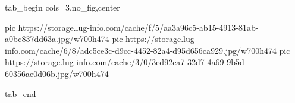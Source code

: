  
 
 
 
 


\ifcmt
  tab_begin cols=3,no_fig,center

     pic https://storage.lug-info.com/cache/f/5/aa3a96c5-ab15-4913-81ab-a0bc837dd63a.jpg/w700h474%
		 pic https://storage.lug-info.com/cache/6/8/adc5ce3c-d9cc-4452-82a4-d95d656ca929.jpg/w700h474%
		 pic https://storage.lug-info.com/cache/3/0/3ed92ca7-32d7-4a69-9b5d-60356ae0d06b.jpg/w700h474%

  tab_end
\fi
